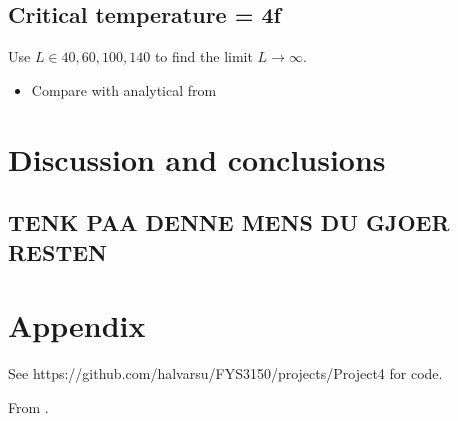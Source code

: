 \documentclass[10pt]{article}
\begin{document}
\begin{multicols}{2}
\subsection{Critical temperature = 4f}
Use $L \in {40, 60, 100, 140}$ to find the limit $L \to \infty$.

\begin{itemize}
    \item Compare with analytical from \cite{PhysRev.65.117}
\end{itemize}



\section{Discussion and conclusions}
\subsection{TENK PAA DENNE MENS DU GJOER RESTEN}
\label{sub:tenk_paa_denne_mens_du_gjoer_resten}




\section*{Appendix}
See https://github.com/halvarsu/FYS3150/projects/Project4 for code.

From \cite{lectureNotes}.

{}


\end{multicols}
\end{document}
